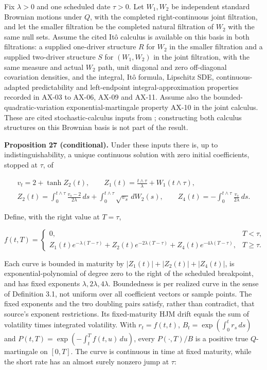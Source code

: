 \documentclass[11pt]{article}
\begin{document}
Fix \(\lambda>0\) and one scheduled date \(\tau>0\). Let \(W_1,W_2\) be independent standard Brownian motions under \(Q\), with the completed right-continuous joint filtration, and let the smaller filtration be the completed natural filtration of \(W_2\) with the same null sets. Assume the cited Itô calculus is available on this basis in both filtrations: a supplied one-driver structure \(R\) for \(W_2\) in the smaller filtration and a supplied two-driver structure \(S\) for \((W_1,W_2)\) in the joint filtration, with the same measure and actual \(W_2\) path, unit diagonal and zero off-diagonal covariation densities, and the integral, Itô formula, Lipschitz SDE, continuous-adapted predictability and left-endpoint integral-approximation properties recorded in AX-03 to AX-06, AX-09 and AX-11. Assume also the bounded-quadratic-variation exponential-martingale property AX-10 in the joint calculus. These are cited stochastic-calculus inputs from \cite{bauerschmidt2020stochastic}; constructing both calculus structures on this Brownian basis is not part of the result.

\label{res:Proposition-27}
\textbf{Proposition 27 (conditional).} Under these inputs there is, up to indistinguishability, a unique continuous solution with zero initial coefficients, stopped at \(\tau\), of

\begin{equation*}
\begin{gathered}
v_t=2+\tanh Z_2(t),\qquad
Z_1(t)=\frac{t\wedge\tau}{\lambda}+W_1(t\wedge\tau),\\
Z_2(t)=\int_0^{t\wedge\tau}\frac{v_s-2}{2\lambda}\,ds+\int_0^{t\wedge\tau}\sqrt{v_s}\,dW_2(s),\qquad
Z_4(t)=-\int_0^{t\wedge\tau}\frac{v_s}{2\lambda}\,ds.
\end{gathered} \tag{3.119}\label{eq:3.119}
\end{equation*}

Define, with the right value at \(T=\tau\),

\begin{equation*}
f(t,T)=\begin{cases}0,&T<\tau,\\
Z_1(t)e^{-\lambda(T-\tau)}+Z_2(t)e^{-2\lambda(T-\tau)}+Z_4(t)e^{-4\lambda(T-\tau)},&T\ge\tau.
\end{cases} \tag{3.120}\label{eq:3.120}
\end{equation*}

Each curve is bounded in maturity by \(|Z_1(t)|+|Z_2(t)|+|Z_4(t)|\), is exponential-polynomial of degree zero to the right of the scheduled breakpoint, and has fixed exponents \(\lambda,2\lambda,4\lambda\). Boundedness is per realized curve in the sense of \cite{filipovic2000exponential} Definition 3.1, not uniform over all coefficient vectors or sample points. The fixed exponents and the two doubling pairs satisfy, rather than contradict, that source's exponent restrictions. Its fixed-maturity HJM drift equals the sum of volatility times integrated volatility. With \(r_t=f(t,t)\), \(B_t=\exp(\int_0^t r_s\,ds)\) and \(P(t,T)=\exp(-\int_t^T f(t,u)\,du)\), every \(P(\cdot,T)/B\) is a positive true \(Q\)-martingale on \([0,T]\). The curve is continuous in time at fixed maturity, while the short rate has an almost surely nonzero jump at \(\tau\):
\end{document}
